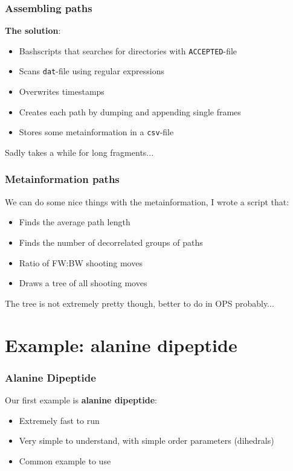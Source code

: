 \documentclass[hyperref={pdfpagelabels=false}]{beamer}
\begin{document}
\begin{frame}
\frametitle{Assembling paths}
\textbf{The solution}: 
\begin{itemize}
\item Bashscripts that searches for directories with \texttt{ACCEPTED}-file
\item Scans \texttt{dat}-file using regular expressions
\item Overwrites timestamps
\item Creates each path by dumping and appending single frames
\item Stores some metainformation in a \texttt{csv}-file
\end{itemize}
Sadly takes a while for long fragments...
\end{frame}

\begin{frame}
\frametitle{Metainformation paths} 
We can do some nice things with the metainformation, I wrote a script that:
\begin{itemize}
\item Finds the average path length
\item Finds the number of decorrelated groups of paths
\item Ratio of FW:BW shooting moves
\item Draws a tree of all shooting moves
\end{itemize}
The tree is not extremely pretty though, better to do in OPS probably...
\end{frame}

\section{Example: alanine dipeptide} 
\setcounter{subsection}{1}

\begin{frame}
\frametitle{Alanine Dipeptide} 
Our first example is \textbf{alanine dipeptide}:
\begin{itemize}
\item Extremely fast to run
\item Very simple to understand, with simple order parameters (dihedrals)
\item Common example to use
\end{itemize}
\end{frame}
\end{document}
